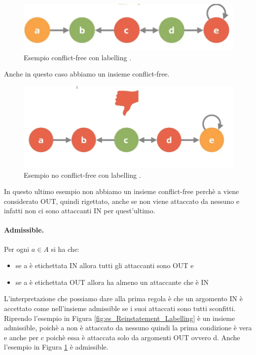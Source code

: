 \begin{figure}[H]
    \centering
    \includegraphics[width=13cm, keepaspectratio]{img/es_conflict_free_labelling.png}
    \caption{Esempio conflict-free con labelling .}\label{fig:es_conflict_free}
\end{figure}
Anche in questo caso abbiamo un insieme conflict-free.
\begin{figure}[H]
    \centering
    \includegraphics[width=13cm, keepaspectratio]{img/es_no_conflict_free_labelling.png}
    \caption{Esempio no conflict-free con labelling .}\label{fig:es_noconflict_free}
\end{figure}
In questo ultimo esempio non abbiamo un insieme conflict-free perchè a viene considerato OUT, quindi rigettato, anche se non viene attaccato da nessuno e infatti non ci sono attaccanti IN per quest'ultimo.

\paragraph{Admissible.}
Per ogni $a \in A$ si ha che:
\begin{itemize}
    \item se a è etichettata IN allora tutti gli attaccanti sono OUT e
    \item se a è etichettata OUT allora ha almeno un attaccante che è IN
\end{itemize}
L'interpretazione che possiamo dare alla prima regola è che un argomento IN è accettato come nell'insieme admissible se i suoi attaccati sono tutti sconfitti.
Riprendo l'esempio in Figura \ref{fig:es_Reinstatement_Labelling} è un insieme admissible, poichè a non è attaccato da nessuno quindi la prima condizione è vera e anche per c poichè essa è attaccata solo da argomenti OUT ovvero d. Anche l'esempio in Figura \ref{fig:es_conflict_free} è admissible.


